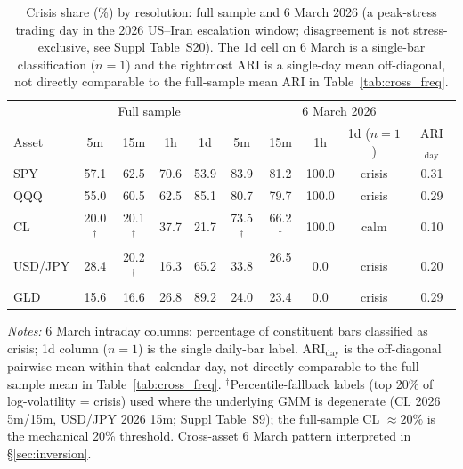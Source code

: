 \documentclass[preprint,12pt,authoryear]{elsarticle}
\begin{document}
\begin{table}[!htbp]
\centering
\footnotesize
\setlength{\tabcolsep}{4pt}
\caption{Crisis share (\%) by resolution: full sample and 6 March 2026 (a peak-stress trading day in the 2026 US--Iran escalation window; disagreement is not stress-exclusive, see Suppl Table~S20). The 1d cell on 6 March is a single-bar classification ($n=1$) and the rightmost ARI is a single-day mean off-diagonal, not directly comparable to the full-sample mean ARI in Table~\ref{tab:cross_freq}.}
\label{tab:crisis_combined}
\begin{tabular}{lcccc|ccccc}
\toprule
 & \multicolumn{4}{c|}{Full sample} & \multicolumn{5}{c}{6 March 2026} \\
Asset & 5m & 15m & 1h & 1d & 5m & 15m & 1h & 1d ($n{=}1$) & ARI$_{\text{day}}$ \\
\midrule
SPY     & 57.1           & 62.5           & 70.6 & 53.9 & 83.9           & 81.2           & 100.0 & crisis & 0.31 \\
QQQ     & 55.0           & 60.5           & 62.5 & 85.1 & 80.7           & 79.7           & 100.0 & crisis & 0.29 \\
CL      & 20.0$^\dagger$ & 20.1$^\dagger$ & 37.7 & 21.7 & 73.5$^\dagger$ & 66.2$^\dagger$ & 100.0 & calm   & 0.10 \\
USD/JPY & 28.4           & 20.2$^\dagger$ & 16.3 & 65.2 & 33.8           & 26.5$^\dagger$ & 0.0   & crisis & 0.20 \\
GLD     & 15.6           & 16.6           & 26.8 & 89.2 & 24.0           & 23.4           & 0.0   & crisis & 0.29 \\
\bottomrule
\end{tabular}
\par\medskip
{\scriptsize\justifying
\textit{Notes:} 6 March intraday columns: percentage of constituent bars classified as crisis; 1d column ($n{=}1$) is the single daily-bar label. ARI$_{\text{day}}$ is the off-diagonal pairwise mean within that calendar day, not directly comparable to the full-sample mean in Table~\ref{tab:cross_freq}. $^\dagger$Percentile-fallback labels (top 20\% of log-volatility = crisis) used where the underlying GMM is degenerate (CL 2026 5m/15m, USD/JPY 2026 15m; Suppl Table~S9); the full-sample CL $\approx 20\%$ is the mechanical 20\% threshold. Cross-asset 6 March pattern interpreted in \S\ref{sec:inversion}.
\par}
\end{table}
\end{document}
